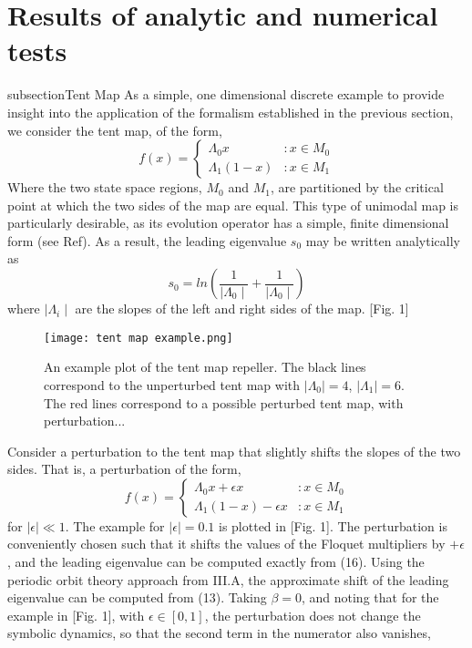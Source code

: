 \documentclass[twocolumn,aip,cha]{revtex4-1}
\begin{document}
\section{Results of analytic and numerical tests}
subsection{Tent Map}
As a simple, one dimensional discrete example to provide insight into the application of the formalism established in the previous section, we consider the tent map, of the form,
\begin{equation}
f(x) = \left\{
     \begin{array}{lr}
       \Lambda_{0} x & : x \in M_{0}\\
       \Lambda_{1} (1-x) & : x \in M_{1}
     \end{array}
   \right.
\end{equation}
Where the two state space regions, $M_{0}$ and $M_{1}$, are partitioned by the critical point at which the two sides of the map are equal. This type of unimodal map is particularly desirable, as its evolution operator has a simple, finite dimensional form (see Ref). As a result, the leading eigenvalue $s_{0}$ may be written analytically as
\begin{equation}
s_{0} = ln\left( \frac{1}{\mid \Lambda_{0}\mid}+\frac{1}{\mid \Lambda_{0}\mid}\right)
\end{equation}
where $\mid \Lambda_{i} \mid$ are the slopes of the left and right sides of the map. [Fig. 1]


\begin{figure}[t]
\begin{centering}
\texttt{[image: tent map example.png]}

\caption{An example plot of the tent map repeller. The black lines correspond to the unperturbed tent map with $\mid \Lambda_{0}\mid=4$, $\mid \Lambda_{1}\mid=6$. The red lines correspond to a possible perturbed tent map, with perturbation...}

\end{centering}
\end{figure}

\indent Consider a perturbation to the tent map that slightly shifts the slopes of the two sides. That is, a perturbation of the form,
\begin{equation}
f(x) = \left\{
     \begin{array}{lr}
       \Lambda_{0} x+\epsilon x & : x \in M_{0}\\
       \Lambda_{1} (1-x)-\epsilon x & : x \in M_{1}
     \end{array}
   \right.
\end{equation}
for $\mid \epsilon \mid \ll 1$. The example for $\mid \epsilon \mid = 0.1$ is plotted in [Fig. 1]. The perturbation is conveniently chosen such that it shifts the values of the Floquet multipliers by $+\epsilon$, and the leading eigenvalue can be computed exactly from (16). Using the periodic orbit theory approach from III.A, the approximate shift of the leading eigenvalue can be computed from (13). Taking $\beta=0$, and noting that for the example in [Fig. 1], with $\epsilon\in [0,1]$, the perturbation does not change the symbolic dynamics, so that the second term in the numerator also vanishes,
\end{document}
